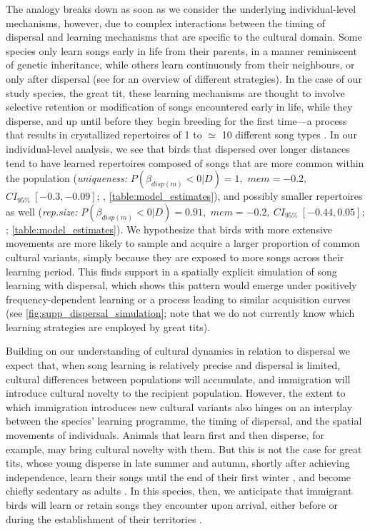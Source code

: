 The analogy breaks down as soon as we consider the underlying individual-level mechanisms, however, due to complex interactions between the timing of dispersal and learning mechanisms that are specific to the cultural domain. Some species only learn songs early in life from their parents, in a manner reminiscent of genetic inheritance, while others learn continuously from their neighbours, or only after dispersal (see \cite{searcy2021} for an overview of different strategies). In the case of our study species, the great tit, these learning mechanisms are thought to involve selective retention or modification of songs encountered early in life, while they disperse, and up until before they begin breeding for the first time---a process that results in crystallized repertoires of 1 to $\simeq$ 10 different song types \autocite{mcgregor1982b,rivera-gutierrez2011,merinorecalde2023a}. In our individual-level analysis, we see that birds that dispersed over longer distances tend to have learned repertoires composed of songs that are more common within the population (\textit{uniqueness:} $P(\beta_{disp (m)} < 0 | D) = 1,$ $mem = -0.2,$ $CI_{95\%}~[-0.3, -0.09]$; , \autoref{table:model_estimates}), and possibly smaller repertoires as well (\textit{rep.size:} $P(\beta_{disp (m)} < 0 | D) = 0.91,$ $mem = -0.2,~CI_{95\%}~[-0.44, 0.05]$; ; \autoref{table:model_estimates}). We hypothesize that birds with more extensive movements are more likely to sample and acquire a larger proportion of common cultural variants, simply because they are exposed to more songs across their learning period. This finds support in a spatially explicit simulation of song learning with dispersal, which shows this pattern would emerge under positively frequency-dependent learning or a process leading to similar acquisition curves (see \autoref{fig:supp_dispersal_simulation}; note that we do not currently know which learning strategies are employed by great tits).

Building on our understanding of cultural dynamics in relation to dispersal we expect that, when song learning is relatively precise and dispersal is limited, cultural differences between populations will accumulate, and immigration will introduce cultural novelty to the recipient population. However, the extent to which immigration introduces new cultural variants also hinges on an interplay between the species' learning programme, the timing of dispersal, and the spatial movements of individuals. Animals that learn first and then disperse, for example, may bring cultural novelty with them. But this is not the case for great tits, whose young disperse in late summer and autumn, shortly after achieving independence, learn their songs until the end of their first winter \autocite{rivera-gutierrez2011}, and become chiefly sedentary as adults \autocite{greenwood1979, dhondt1979, dingemanse2003}. In this species, then, we anticipate that immigrant birds will learn or retain songs they encounter upon arrival, either before or during the establishment of their territories \autocite{keen2020, graham2018}.

